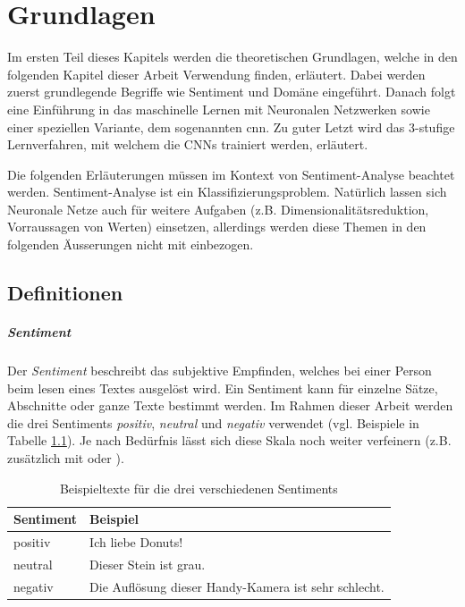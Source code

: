 \chapter{Grundlagen}
Im ersten Teil dieses Kapitels werden die theoretischen Grundlagen, welche in den folgenden Kapitel dieser Arbeit Verwendung finden, erläutert. Dabei werden zuerst grundlegende Begriffe wie Sentiment und Domäne eingeführt. Danach folgt eine Einführung in das maschinelle Lernen mit Neuronalen Netzwerken sowie einer speziellen Variante, dem sogenannten \gls{cnn}. Zu guter Letzt wird das 3-stufige Lernverfahren, mit welchem die CNNs trainiert werden, erläutert.

Die folgenden Erläuterungen müssen im Kontext von Sentiment-Analyse beachtet werden. Sentiment-Analyse ist ein Klassifizierungsproblem. Natürlich lassen sich Neuronale Netze auch für weitere Aufgaben (z.B. Dimensionalitätsreduktion, Vorraussagen von Werten) einsetzen, allerdings werden diese Themen in den folgenden Äusserungen nicht mit einbezogen.

\section{Definitionen}
\paragraph{Sentiment}
Der \emph{Sentiment} beschreibt das subjektive Empfinden, welches bei einer Person beim lesen eines Textes ausgelöst wird. Ein Sentiment kann für einzelne Sätze, Abschnitte oder ganze Texte bestimmt werden. Im Rahmen dieser Arbeit werden die drei Sentiments \emph{positiv}, \emph{neutral} und \emph{negativ} verwendet (vgl. Beispiele in Tabelle \ref{basics:sentiments_example_table}). Je nach Bedürfnis lässt sich diese Skala noch weiter verfeinern (z.B. zusätzlich mit  oder ).

\begin{table}[h]
  \centering
  \begin{tabular}{ll}
    \toprule
    Sentiment & Beispiel\\
    \midrule
    positiv & Ich liebe Donuts!\\
    neutral & Dieser Stein ist grau.\\
    negativ & Die Auflösung dieser Handy-Kamera ist sehr schlecht.\\
    \bottomrule
  \end{tabular}
  \caption{Beispieltexte für die drei verschiedenen Sentiments}
  \label{basics:sentiments_example_table}
\end{table}

